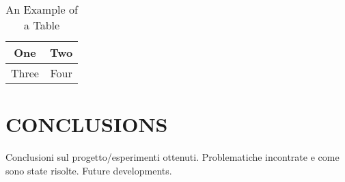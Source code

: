 \documentclass[letterpaper, 10 pt, conference]{ieeeconf}  %
\begin{document}
\begin{table}[h]
\caption{An Example of a Table}
\label{table_example}
\begin{center}
\begin{tabular}{|c||c|}
\hline
One & Two\\
\hline
Three & Four\\
\hline
\end{tabular}
\end{center}
\end{table}

\section{CONCLUSIONS}

Conclusioni sul progetto/esperimenti ottenuti.
Problematiche incontrate e come sono state risolte.
Future developments.

\addtolength{\textheight}{-12cm}   %
%
%
%




\end{document}
